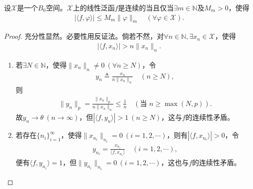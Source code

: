 \documentclass[../../main.tex]{subfiles}%
\begin{document}
\begin{lemma}\label{lemma:泛函分析--引理hweiowj}
设$\mathscr{X}$是一个$B_0$空间。$\mathscr{X}$上的线性泛函$f$是连续的当且仅当$\exists m\in\mathbb{N}$及$M_m>0$，使得
\begin{align*}
|\langle f,\varphi\rangle|\leqslant M_m\|\varphi\|_m\quad(\forall\varphi\in\mathscr{X}).
\end{align*}
\end{lemma}
\begin{proof}

充分性显然。必要性用反证法。倘若不然，对$\forall n\in\mathbb{N},\exists x_n\in\mathscr{X}$，使得
\begin{align}
|\langle f,x_n\rangle|>n\|x_n\|_n.\label{eq:4-2-5}
\end{align}
\begin{enumerate}[(1)]
\item 若$\exists N\in\mathbb{N}$，使得$\|x_n\|_n\neq0\ (\forall n\geqslant N)$，令
\begin{align*}
y_n\triangleq\frac{x_n}{n\|x_n\|_n}\quad(n\geqslant N),
\end{align*}
则
\begin{align*}
\|y_n\|_p=\frac{\|x_n\|_p}{n\|x_n\|_n}\leqslant\frac{1}{n}\quad(\text{当 }n\geqslant\max(N,p)).
\end{align*}
故$y_n\to\theta\ (n\to\infty)$，但$|\langle f,y_n\rangle|>1\ (n\geqslant N)$，这与$f$的连续性矛盾。

\item 若存在$\{n_i\}_{i=1}^\infty$，使得$\|x_{n_i}\|_{n_i}=0\ (i=1,2,\cdots)$，则有$|\langle f,x_{n_i}\rangle|>0$，令
\begin{align*}
y_{n_i}=\frac{x_{n_i}}{\langle f,x_{n_i}\rangle}\quad(i=1,2,\cdots),
\end{align*}
便有$\langle f,y_{n_i}\rangle=1$，但$\|y_{n_i}\|_{n_i}=0\ (i=1,2,\cdots)$，这也与$f$的连续性矛盾。
\end{enumerate}

\end{proof}
\end{document}

